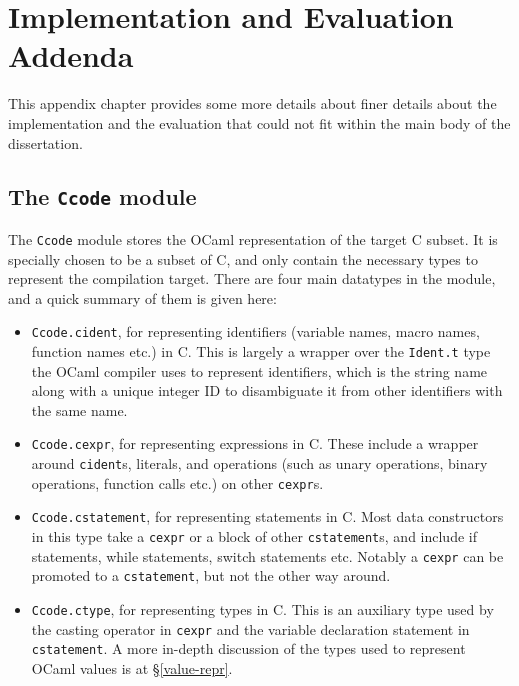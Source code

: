 \appendix

\chapter{Implementation and Evaluation Addenda}

This appendix chapter provides some more details about finer details about the
implementation and the evaluation that could not fit within the main body of the
dissertation.

\section{The \texttt{Ccode} module}\label{ccode}

The \texttt{Ccode} module stores the OCaml representation of the target C
subset. It is specially chosen to be a subset of C, and only contain the
necessary types to represent the compilation target. There are four main
datatypes in the module, and a quick summary of them is given here:

\begin{itemize}

\item \texttt{Ccode.cident}, for representing identifiers (variable names, macro
    names, function names etc.) in C. This is largely a wrapper over the
    \texttt{Ident.t} type the OCaml compiler uses to represent identifiers,
    which is the string name along with a unique integer ID to disambiguate it
    from other identifiers with the same name.

\item \texttt{Ccode.cexpr}, for representing expressions in C. These include a
    wrapper around \texttt{cident}s, literals, and operations (such as unary
    operations, binary operations, function calls etc.) on other
    \texttt{cexpr}s.

\item \texttt{Ccode.cstatement}, for representing statements in C. Most data
    constructors in this type take a \texttt{cexpr} or a block of other
    \texttt{cstatement}s, and include if statements, while statements, switch
    statements etc. Notably a \texttt{cexpr} can be promoted to a
    \texttt{cstatement}, but not the other way around.

\item \texttt{Ccode.ctype}, for representing types in C. This is an auxiliary
    type used by the casting operator in \texttt{cexpr} and the variable
    declaration statement in \texttt{cstatement}. A more in-depth discussion of
    the types used to represent OCaml values is at \S\ref{value-repr}.

\end{itemize}

